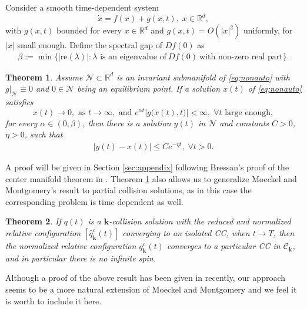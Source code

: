 \documentclass[11pt]{amsart}
\newtheorem{theorem}{Theorem}[section]
\theoremstyle{definition}
\theoremstyle{remark}
\numberwithin{equation}{section}
\newcommand{\rr}{\mathbb R}
\newcommand{\bk}{\mathbf k}
\begin{document}
Consider a smooth time-dependent system  
    \begin{equation}
    \label{eq;nonauto}
        \dot{x}=f(x)+g(x,t), \; x \in \rr^d,
    \end{equation}
    with $g(x,t)$ bounded for every $x\in\mathbb{R}^d$ and $g(x,t)=O(|x|^2)$ uniformly, for $|x|$ small enough. Define the spectral gap of $Df(0)$ as 
    \begin{align*}
    \beta:=\min\{|\text{re}(\lambda)|:\lambda \text{ is\ an eigenvalue\ of}\ Df(0)\ \text{with\ non-zero\ real\ part} \}. 
\end{align*}


\begin{theorem} \label{thm;cen-mfd-time-dep}
   Assume $\mathcal{N} \subset \rr^d$ is an invariant submanifold of  \eqref{eq;nonauto} with $g|_{\mathcal{N}}\equiv0$ and $0 \in \mathcal{N}$ being an equilibrium point. If a solution $x(t)$ of \eqref{eq;nonauto} satisfies
    \begin{equation}
    \label{eq;con-nonauto}
        x(t)\rightarrow0, \text{ as } t \to \infty, \text{ and } e^{\alpha t}|g\big(x(t),t\big)|<\infty, \; \forall t \text{ large enough},
    \end{equation}
    for every $\alpha\in (0,\beta)$,
    then there is a solution $y(t)$ in $\mathcal{N}$ and constants $C>0$, $\eta>0$, such that
    \begin{align*}
        |y(t)-x(t)|\le Ce^{-\eta t}, \; \forall t >0. 
    \end{align*} 
\end{theorem}
A proof will be given in Section \ref{sec:appendix} following Bressan's proof of the center manifold theorem in \cite{Br03}. Theorem \ref{thm;cen-mfd-time-dep} also allows us to generalize Moeckel and Montgomery's result to partial collision solutions, as in this case the corresponding problem is time dependent as well.   
\begin{theorem}
	\label{thm;par-coll} If $q(t)$ is a $\bk$-collision solution with the reduced and normalized relative configuration $[\hat{q}^c_{\bk}(t)]$ converging to an isolated CC, when $t \to T$, then the normalized relative configuration $q^c_{\bk}(t)$ converges to a particular CC in $\mathscr{C}_{\bk}$, and in particular there is no infinite spin. 
\end{theorem}

Although a proof of the above result has been given in \cite{GSZ24} recently,  our approach seems to be a more natural extension of Moeckel and Montgomery and we feel it is worth to include it here.    
\end{document}
